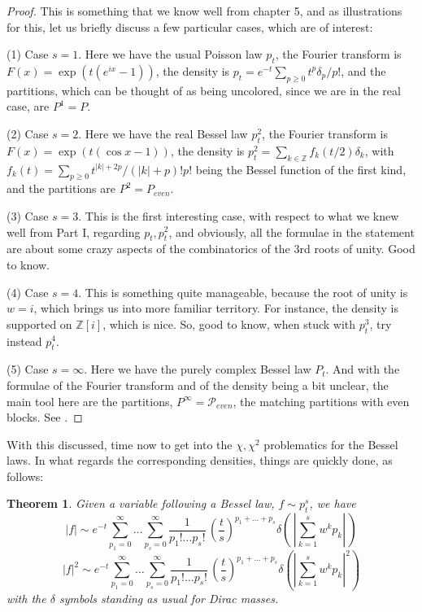 \documentclass[12pt]{amsbook}
\newtheorem{theorem}{Theorem}[chapter]
\begin{document}
\begin{proof}
This is something that we know well from chapter 5, and as illustrations for this, let us briefly discuss a few particular cases, which are of interest:

\medskip

(1) Case $s=1$. Here we have the usual Poisson law $p_t$, the Fourier transform is $F(x)=\exp(t(e^{ix}-1))$, the density is $p_t=e^{-t}\sum_{p\geq0}t^p\delta_p/p!$, and the partitions, which can be thought of as being uncolored, since we are in the real case, are $P^1=P$.

\medskip

(2) Case $s=2$. Here we have the real Bessel law $p_t^2$, the Fourier transform is $F(x)=\exp(t(\cos x-1))$, the density is $p_t^2=\sum_{k\in\mathbb Z}f_k(t/2)\delta_k$, with $f_k(t)=\sum_{p\geq0}t^{|k|+2p}/(|k|+p)!p!$ being the Bessel function of the first kind, and the partitions are $P^2=P_{even}$.

\medskip

(3) Case $s=3$. This is the first interesting case, with respect to what we knew well from Part I, regarding $p_t,p_t^2$, and obviously, all the formulae in the statement are about some crazy aspects of the combinatorics of the 3rd roots of unity. Good to know.

\medskip

(4) Case $s=4$. This is something quite manageable, because the root of unity is $w=i$, which brings us into more familiar territory. For instance, the density is supported on $\mathbb Z[i]$, which is nice. So, good to know, when stuck with $p^3_t$, try instead $p^4_t$.

\medskip

(5) Case $s=\infty$. Here we have the purely complex Bessel law $P_t$. And with the formulae of the Fourier transform and of the density being a bit unclear, the main tool here are the partitions, $P^\infty=\mathcal P_{even}$, the matching partitions with even blocks. See \cite{bb+}.
\end{proof}

With this discussed, time now to get into the $\chi,\chi^2$ problematics for the Bessel laws. In what regards the corresponding densities, things are quickly done, as follows:

\begin{theorem}
Given a variable following a Bessel law, $f\sim p^s_t$, we have
$$|f|\sim e^{-t}\sum_{p_1=0}^\infty\ldots\sum_{p_s=0}^\infty\frac{1}{p_1!\ldots p_s!}\,\left(\frac{t}{s}\right)^{p_1+\ldots+p_s}\delta\left(\,\left|\sum_{k=1}^sw^kp_k\right|\,\right)$$
$$|f|^2\sim e^{-t}\sum_{p_1=0}^\infty\ldots\sum_{p_s=0}^\infty\frac{1}{p_1!\ldots p_s!}\,\left(\frac{t}{s}\right)^{p_1+\ldots+p_s}\delta\left(\left|\sum_{k=1}^sw^kp_k\right|^2\right)$$
with the $\delta$ symbols standing as usual for Dirac masses.
\end{theorem}
\end{document}

